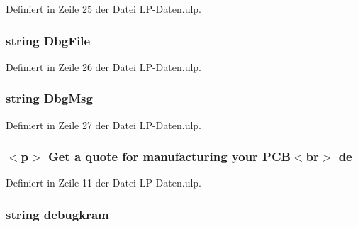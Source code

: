 Definiert in Zeile 25 der Datei L\+P-\/\+Daten.\+ulp.

\hypertarget{_l_p-_daten_8ulp_a797bf1dcb6e1aec11a1b60fd7a3c1a4f}{}
\subsubsection[{Dbg\+File}]{\setlength{\rightskip}{0pt plus 5cm}string Dbg\+File}\label{_l_p-_daten_8ulp_a797bf1dcb6e1aec11a1b60fd7a3c1a4f}


Definiert in Zeile 26 der Datei L\+P-\/\+Daten.\+ulp.

\hypertarget{_l_p-_daten_8ulp_ae2c2fa64831f7aec6e2649da184fb47a}{}
\subsubsection[{Dbg\+Msg}]{\setlength{\rightskip}{0pt plus 5cm}string Dbg\+Msg}\label{_l_p-_daten_8ulp_ae2c2fa64831f7aec6e2649da184fb47a}


Definiert in Zeile 27 der Datei L\+P-\/\+Daten.\+ulp.

\hypertarget{_l_p-_daten_8ulp_a6de8b8849fbee63bd72b5f38731e998a}{}
\subsubsection[{de}]{\setlength{\rightskip}{0pt plus 5cm}$<$p$>$ Get a quote {\bf for} manufacturing your P\+C\+B$<$br$>$ de}\label{_l_p-_daten_8ulp_a6de8b8849fbee63bd72b5f38731e998a}


Definiert in Zeile 11 der Datei L\+P-\/\+Daten.\+ulp.

\hypertarget{_l_p-_daten_8ulp_af70accd3259e060f8b6104caba740774}{}
\subsubsection[{debugkram}]{\setlength{\rightskip}{0pt plus 5cm}string debugkram}\label{_l_p-_daten_8ulp_af70accd3259e060f8b6104caba740774}


